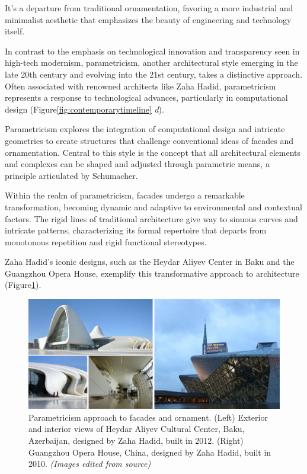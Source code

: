 It's a departure from traditional ornamentation, favoring a more industrial and minimalist aesthetic that emphasizes the beauty of engineering and technology itself.


In contrast to the emphasis on technological innovation and transparency seen in high-tech modernism, parametricism, another architectural style emerging in the late 20th century and evolving into the 21st century, takes a distinctive approach.
Often associated with renowned architects like Zaha Hadid, parametricism represents a response to technological advances, particularly in computational design (Figure\ref{fig:contemporarytimeline} \textit{d}).

Parametricism explores the integration of computational design and intricate geometries to create structures that challenge conventional ideas of facades and ornamentation.
Central to this style is the concept that all architectural elements and complexes can be shaped and adjusted through parametric means, a principle articulated by Schumacher\cite{Schumacher2010}.

Within the realm of parametricism, facades undergo a remarkable transformation, becoming dynamic and adaptive to environmental and contextual factors.
The rigid lines of traditional architecture give way to sinuous curves and intricate patterns, characterizing its formal repertoire that departs from monotonous repetition and rigid functional stereotypes\cite{Schumacher2008}.

Zaha Hadid's iconic designs, such as the Heydar Aliyev Center in Baku and the Guangzhou Opera House, exemplify this transformative approach to architecture (Figure\ref{fig:Parametricism}).

     \begin{figure}[t]
          \centering
          \includegraphics[width= \linewidth]{Images/Parametricism}
          \caption{Parametricism approach to facades and ornament. (Left) Exterior and interior views of Heydar Aliyev Cultural Center, Baku, Azerbaijan, designed by Zaha Hadid, built in 2012. (Right) Guangzhou Opera House,  China, designed by Zaha Hadid, built in 2010. \textit{(Images edited from source)}}
          \label{fig:Parametricism}
        \end{figure}

